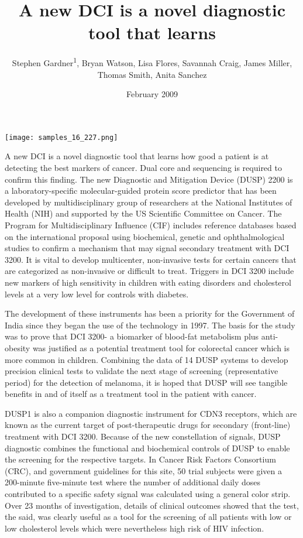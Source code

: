 \documentclass{article}
\title{A new DCI is a novel diagnostic tool that learns}
\author{Stephen Gardner\textsuperscript{1},  Bryan Watson,  Lisa Flores,  Savannah Craig,  James Miller,  Thomas Smith,  Anita Sanchez}
\affil{\textsuperscript{1}LyondellBasell Industries}
\date{February 2009}
\begin{document}
\maketitle

\begin{center}
\begin{minipage}{0.75\linewidth}
\texttt{[image: samples\_16\_227.png]}
\end{minipage}
\end{center}

A new DCI is a novel diagnostic tool that learns how good a patient is at detecting the best markers of cancer. Dual core and sequencing is required to confirm this finding. The new Diagnostic and Mitigation Device (DUSP) 2200 is a laboratory-specific molecular-guided protein score predictor that has been developed by multidisciplinary group of researchers at the National Institutes of Health (NIH) and supported by the US Scientific Committee on Cancer. The Program for Multidisciplinary Influence (CIF) includes reference databases based on the international proposal using biochemical, genetic and ophthalmological studies to confirm a mechanism that may signal secondary treatment with DCI 3200. It is vital to develop multicenter, non-invasive tests for certain cancers that are categorized as non-invasive or difficult to treat. Triggers in DCI 3200 include new markers of high sensitivity in children with eating disorders and cholesterol levels at a very low level for controls with diabetes.

The development of these instruments has been a priority for the Government of India since they began the use of the technology in 1997. The basis for the study was to prove that DCI 3200- a biomarker of blood-fat metabolism plus anti-obesity was justified as a potential treatment tool for colorectal cancer which is more common in children. Combining the data of 14 DUSP systems to develop precision clinical tests to validate the next stage of screening (representative period) for the detection of melanoma, it is hoped that DUSP will see tangible benefits in and of itself as a treatment tool in the patient with cancer.

DUSP1 is also a companion diagnostic instrument for CDN3 receptors, which are known as the current target of post-therapeutic drugs for secondary (front-line) treatment with DCI 3200. Because of the new constellation of signals, DUSP diagnostic combines the functional and biochemical controls of DUSP to enable the screening for the respective targets. In Cancer Risk Factors Consortium (CRC), and government guidelines for this site, 50 trial subjects were given a 200-minute five-minute test where the number of additional daily doses contributed to a specific safety signal was calculated using a general color strip. Over 23 months of investigation, details of clinical outcomes showed that the test, the said, was clearly useful as a tool for the screening of all patients with low or low cholesterol levels which were nevertheless high risk of HIV infection.
\end{document}
